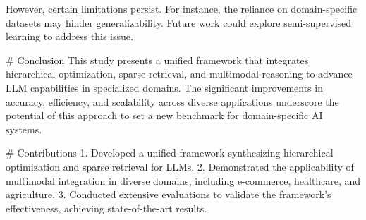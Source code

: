 However, certain limitations persist. For instance, the reliance on domain-specific datasets may hinder generalizability. Future work could explore semi-supervised learning to address this issue.

# Conclusion  
This study presents a unified framework that integrates hierarchical optimization, sparse retrieval, and multimodal reasoning to advance LLM capabilities in specialized domains. The significant improvements in accuracy, efficiency, and scalability across diverse applications underscore the potential of this approach to set a new benchmark for domain-specific AI systems.

# Contributions  
1. Developed a unified framework synthesizing hierarchical optimization and sparse retrieval for LLMs.  
2. Demonstrated the applicability of multimodal integration in diverse domains, including e-commerce, healthcare, and agriculture.  
3. Conducted extensive evaluations to validate the framework's effectiveness, achieving state-of-the-art results.  